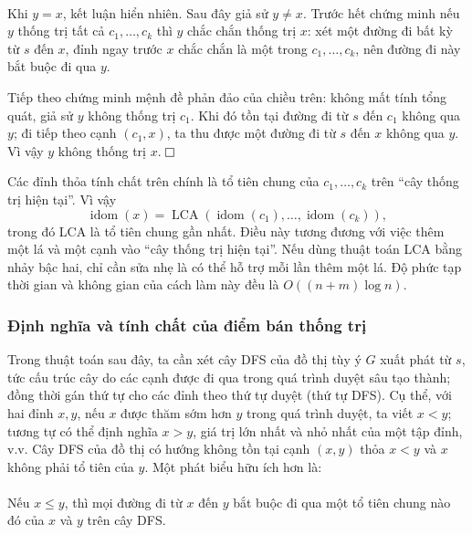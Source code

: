 \documentclass[11pt]{article}
\newcommand{\proofbox}{\ensuremath{\vcenter{\hrule height 0.45pt
  \hbox{\vrule width 0.45pt height 6pt\kern 6pt\vrule width 0.45pt}
  \hrule height 0.45pt}}}
\begin{document}
\paragraph{}
Khi \(y=x\), kết luận hiển nhiên. Sau đây giả sử \(y\ne x\). Trước hết chứng
minh nếu \(y\) thống trị tất cả \(c_1,\ldots,c_k\) thì \(y\) chắc chắn thống
trị \(x\): xét một đường đi bất kỳ từ \(s\) đến \(x\), đỉnh ngay trước \(x\)
chắc chắn là một trong \(c_1,\ldots,c_k\), nên đường đi này bắt buộc đi qua
\(y\).

Tiếp theo chứng minh mệnh đề phản đảo của chiều trên: không mất tính tổng quát,
giả sử \(y\) không thống trị \(c_1\). Khi đó tồn tại đường đi từ \(s\) đến
\(c_1\) không qua \(y\); đi tiếp theo cạnh \((c_1,x)\), ta thu được một đường
đi từ \(s\) đến \(x\) không qua \(y\). Vì vậy \(y\) không thống trị \(x\).
\proofbox

Các đỉnh thỏa tính chất trên chính là tổ tiên chung của \(c_1,\ldots,c_k\) trên
``cây thống trị hiện tại''. Vì vậy
\[
\operatorname{idom}(x)=
\operatorname{LCA}(\operatorname{idom}(c_1),\ldots,\operatorname{idom}(c_k)),
\]
trong đó LCA là tổ tiên chung gần nhất. Điều này tương đương với việc thêm một
lá và một cạnh vào ``cây thống trị hiện tại''. Nếu dùng thuật toán LCA bằng
nhảy bậc hai, chỉ cần sửa nhẹ là có thể hỗ trợ mỗi lần thêm một lá. Độ phức tạp
thời gian và không gian của cách làm này đều là \(O((n+m)\log n)\).

\subsubsection{Định nghĩa và tính chất của điểm bán thống trị}

Trong thuật toán sau đây, ta cần xét cây DFS của đồ thị tùy ý \(G\) xuất phát
từ \(s\), tức cấu trúc cây do các cạnh được đi qua trong quá trình duyệt sâu
tạo thành; đồng thời gán thứ tự cho các đỉnh theo thứ tự duyệt (thứ tự DFS).
Cụ thể, với hai đỉnh \(x,y\), nếu \(x\) được thăm sớm hơn \(y\) trong quá trình
duyệt, ta viết \(x<y\); tương tự có thể định nghĩa \(x>y\), giá trị lớn nhất và
nhỏ nhất của một tập đỉnh, v.v. Cây DFS của đồ thị có hướng không tồn tại cạnh
\((x,y)\) thỏa \(x<y\) và \(x\) không phải tổ tiên của \(y\). Một phát biểu hữu
ích hơn là:

\paragraph{}
Nếu \(x\le y\), thì mọi đường đi từ \(x\) đến \(y\) bắt buộc đi qua một tổ tiên
chung nào đó của \(x\) và \(y\) trên cây DFS.
\end{document}
